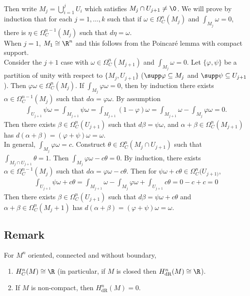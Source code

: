 \documentclass[11pt]{article}
\begin{document}
Then write \(M_{j}=\bigcup_{i=1}^{j}U_{i}\) which satisfies \(M_{j}\cap U_{j+1}\neq\0\). We will prove by induction that for each \(j=1,\ldots,k\) such that if \(\omega\in\Omega_{C}^{n}(M_{j})\) and \(\int_{M_{j}}\omega=0\), there is \(\eta\in\Omega_{C}^{n-1}(M_{j})\) such that \(d\eta=\omega\).\\
When \(j=1\), \(M_{1}\cong\R^{n}\) and this follows from the Poincaré lemma with compact support.\\
Consider the \(j+1\) case with \(\omega\in\Omega_{C}^{n}(M_{j+1})\) and \(\int_{M_{j}}\omega=0\). Let \(\{\varphi,\psi\}\) be a partition of unity with respect to \(\{M_{j},U_{j+1}\}\) (\(\supp\varphi\subseteq M_{j}\) and \(\supp\psi\subseteq U_{j+1}\)). Then \(\varphi\omega\in\Omega_{C}^{n}(M_{j})\). If \(\int_{M_{j}}\varphi\omega=0\), then by induction there exists \(\alpha\in\Omega^{n-1}_{C}(M_{j})\) such that \(d\alpha=\varphi\omega\). By assumption\\
\begin{align*}
  \int_{U_{j+1}}\psi\omega
  =\int_{M_{j+1}}\psi\omega
  =\int_{M_{j+1}}(1-\varphi)\omega
  =\int_{M_{j+1}}\omega-\int_{M_{j}}\varphi\omega
  =0.
\end{align*}
Then there exists \(\beta\in\Omega_{C}^{n}(U_{j+1})\) such that \(d\beta=\psi\omega\), and \(\alpha+\beta\in\Omega_{C}^{n}(M_{j+1})\) has \(d(\alpha+\beta)=(\varphi+\psi)\omega=\omega\).\\
In general, \(\int_{M_{j}}\varphi\omega=c\). Construct \(\theta\in\Omega_{C}^{n}(M_{j}\cap U_{j+1})\) such that \(\int_{M_{j}\cap U_{j+1}}\theta=1\). Then \(\int_{M_{j}}\varphi\omega-c\theta=0\). By induction, there exists \(\alpha\in\Omega_{C}^{n-1}(M_{j})\) such that \(d\alpha=\varphi\omega-c\theta\). Then for \(\psi\omega+c\theta\in\Omega_{C}^{n}(U_{j+1)}\),\\
\begin{align*}
  \int_{U_{j+1}}\psi\omega+c\theta
  =\int_{M_{j+1}}\omega-\int_{M_{j}}\varphi\omega+\int_{U_{j+1}}c\theta
  =0-c+c
  =0
\end{align*}
Then there exists \(\beta\in\Omega_{C}^{n}(U_{j+1})\) such that \(d\beta=\psi\omega+c\theta\) and \(\alpha+\beta\in\Omega_{C}^{n}(M_{j}+1)\) has \(d(\alpha+\beta)=(\varphi+\psi)\omega=\omega\).\\
\subsection*{Remark}
\label{sec:org97f1a9d}
For \(M^{n}\) oriented, connected and without boundary,\\
\begin{enumerate}
\item \(H_{C}^{n}(M)\cong\R\) (in particular, if \(M\) is closed then \(H^{n}_{\text{dR}}(M)\cong\R\)).\\
\item If \(M\) is non-compact, then \(H^{n}_{\text{dR}}(M)=0\).\\
\end{enumerate}
\end{document}
